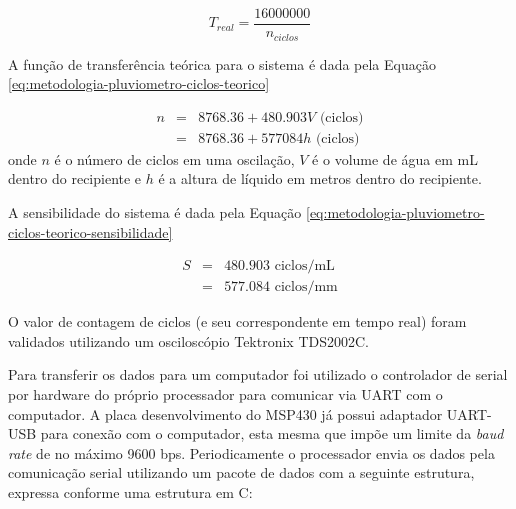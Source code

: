 \documentclass[a4paper]{instrumentacao}
\begin{document}
\begin{equation}
	T_{real} = \frac{16 000 000}{n_{ciclos}}
	\label{eq:metodologia-pluviometro-relacao-ciclos-tempo}
\end{equation}

A função de transferência teórica para o sistema é dada pela Equação \ref{eq:metodologia-pluviometro-ciclos-teorico}

\begin{eqnarray}
	n &=& 8768.36 + 480.903 V \text{ (ciclos)} \label{eq:metodologia-pluviometro-ciclos-teorico} \\
	  &=& 8768.36 + 577084 h \text{ (ciclos)} \nonumber
\end{eqnarray}
\noindent onde $n$ é o número de ciclos em uma oscilação, $V$ é o volume de água em mL dentro do recipiente e $h$ é a altura de líquido em metros dentro do recipiente.

A sensibilidade do sistema é dada pela Equação \ref{eq:metodologia-pluviometro-ciclos-teorico-sensibilidade}

\begin{eqnarray}
	S &=& 480.903 \text{ ciclos/mL} \label{eq:metodologia-pluviometro-ciclos-teorico-sensibilidade} \\
	  &=& 577.084 \text{ ciclos/mm} \nonumber
\end{eqnarray}

O valor de contagem de ciclos (e seu correspondente em tempo real) foram validados utilizando um osciloscópio Tektronix TDS2002C.

Para transferir os dados para um computador foi utilizado o controlador de serial por hardware do próprio processador para comunicar via UART com o computador. A placa desenvolvimento do MSP430 já possui adaptador UART-USB para conexão com o computador, esta mesma que impõe um limite da \textit{baud rate} de no máximo 9600 bps. Periodicamente o processador envia os dados pela comunicação serial utilizando um pacote de dados com a seguinte estrutura, expressa conforme uma estrutura em C:
\end{document}

